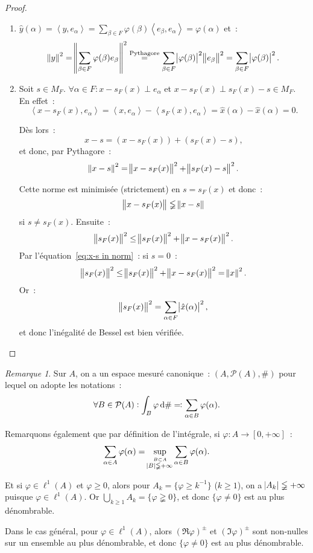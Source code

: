 \documentclass{report}
\newcommand{\scpr}[2]{\left\langle#1, #2\right\rangle}
\newcommand{\pinfty}{{+\infty}}
\theoremstyle{definition}
\theoremstyle{remark}
\newtheorem*{rmq}{Remarque}
\begin{document}
\begin{proof}~
\begin{enumerate}
	\item $\hat y(\alpha) = \scpr y{e_\alpha} = \sum_{\beta \in F}\varphi(\beta)\scpr {e_\beta}{e_\alpha} = \varphi(\alpha)$ et~:
	\[\norm y^2 = \norm {\sum_{\beta \in F}\varphi(\beta)e_\beta}^2 \stackrel {\text{Pythagore}}= \sum_{\beta \in F}\abs {\varphi(\beta)}^2\norm {e_\beta}^2 = \sum_{\beta \in F}\abs {\varphi(\beta)}^2.\]
	\item Soit $s \in M_F$. $\forall \alpha \in F : x-s_F(x) \perp e_\alpha$ et $x-s_F(x) \perp s_F(x)-s \in M_F$. En effet~:
	\[\scpr {x-s_F(x)}{e_\alpha} = \scpr x{e_\alpha} - \scpr {s_F(x)}{e_\alpha} = \hat x(\alpha) - \hat x(\alpha) = 0.\]

	Dès lors~:
	\[x-s = (x - s_F(x)) + (s_F(x) - s),\]
	et donc, par Pythagore~:
	\begin{align}\label{eq:x-s in norm}
		\norm {x-s}^2 = \norm {x-s_F(x)}^2 + \norm {s_F(x) - s}^2.
	\end{align}

	Cette norme est minimisée (strictement) en $s = s_F(x)$ et donc~:
	\[\norm {x-s_F(x)} \lneqq \norm {x-s}\]
	si $s \neq s_F(x)$. Ensuite~:
	\[\norm {s_F(x)}^2 \leq \norm {s_F(x)}^2 + \norm {x-s_F(x)}^2.\]
	Par l'équation~\ref{eq:x-s in norm}~: si $s = 0$~:
	\[\norm {s_F(x)}^2 \leq \norm {s_F(x)}^2 + \norm {x-s_F(x)}^2 = \norm x^2.\]
	Or~:
	\[\norm {s_F(x)}^2 = \sum_{\alpha \in F}\abs {\hat x(\alpha)}^2,\]
	et donc l'inégalité de Bessel est bien vérifiée.
\end{enumerate}
\end{proof}

\begin{rmq} Sur $A$, on a un espace mesuré canonique~: $(A, \mathcal P(A), \#)$ pour lequel on adopte les notations~:
\[\forall B \in \mathcal P(A) : \int_B\varphi\dif\# \eqqcolon \sum_{\alpha \in B}\varphi(\alpha).\]

Remarquons également que par définition de l'intégrale, si $\varphi : A \to [0, \pinfty]$~:
\[\sum_{\alpha \in A}\varphi(\alpha) = \sup_{\stackrel {B \subset A}{\abs B \lneqq \pinfty}}\sum_{\alpha \in B}\varphi(\alpha).\]

Et si $\varphi \in \ell^1(A)$ et $\varphi \geq 0$, alors pour $A_k = \{\varphi \geq k^{-1}\}$ ($k \geq 1$), on a $\abs {A_k} \lneqq \pinfty$ puisque $\varphi \in \ell^1(A)$.
Or $\bigcup_{k \geq 1}A_k = \{\varphi \gneqq 0\}$, et donc $\{\varphi \neq 0\}$ est au plus dénombrable.

Dans le cas général, pour $\varphi \in \ell^1(A)$, alors $(\Re \varphi)^\pm$ et $(\Im \varphi)^\pm$ sont non-nulles sur un ensemble au plus dénombrable, et donc $\{\varphi \neq 0\}$
est au plus dénombrable.
\end{rmq}
\end{document}
